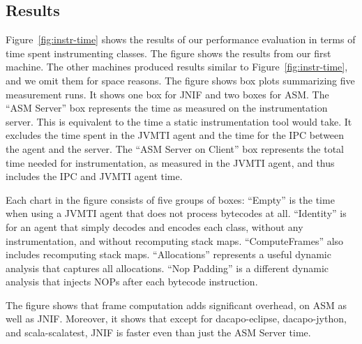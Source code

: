 \subsection*{Results}

Figure~\ref{fig:instr-time} shows the results of our performance evaluation
in terms of time spent instrumenting classes.
The figure shows the results from our first machine.
The other machines produced results similar to Figure~\ref{fig:instr-time}, 
and we omit them for space reasons.
The figure shows box plots summarizing five measurement runs.
It shows one box for JNIF and two boxes for ASM.
The ``ASM Server'' box represents the time as measured on the instrumentation server.
This is equivalent to the time a static instrumentation tool would take.
It excludes the time spent in the JVMTI agent and the time for the IPC between the agent and the server.
The ``ASM Server on Client'' box represents the total time needed for instrumentation, 
as measured in the JVMTI agent,
and thus includes the IPC and JVMTI agent time.

Each chart in the figure consists of five groups of boxes:
``Empty'' is the time when using a JVMTI agent that does not process bytecodes at all.
``Identity'' is for an agent that simply decodes and encodes each class, without any instrumentation, and without recomputing stack maps.
``ComputeFrames'' also includes recomputing stack maps.
``Allocations'' represents a useful dynamic analysis that captures all allocations.
``Nop Padding'' is a different dynamic analysis that injects NOPs after each bytecode instruction. 

The figure shows that frame computation adds significant overhead, on ASM as well as JNIF.
Moreover, it shows that except for dacapo-eclipse, dacapo-jython, and scala-scalatest,
JNIF is faster even than just the ASM Server time.




